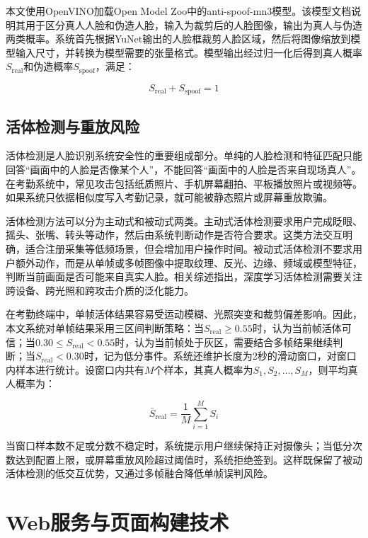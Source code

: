 本文使用OpenVINO加载Open Model Zoo中的anti-spoof-mn3模型。该模型文档说明其用于区分真人人脸和伪造人脸，输入为裁剪后的人脸图像，输出为真人与伪造两类概率\cite{openvino_anti_spoof}。系统首先根据YuNet输出的人脸框裁剪人脸区域，然后将图像缩放到模型输入尺寸，并转换为模型需要的张量格式。模型输出经过归一化后得到真人概率$S_{\text{real}}$和伪造概率$S_{\text{spoof}}$，满足：

\begin{equation}
    S_{\text{real}} + S_{\text{spoof}} = 1
\end{equation}

\subsection{活体检测与重放风险}

活体检测是人脸识别系统安全性的重要组成部分。单纯的人脸检测和特征匹配只能回答“画面中的人脸是否像某个人”，不能回答“画面中的人脸是否来自现场真人”。在考勤系统中，常见攻击包括纸质照片、手机屏幕翻拍、平板播放照片或视频等。如果系统只依据相似度写入考勤记录，就可能被静态照片或屏幕重放欺骗。

活体检测方法可以分为主动式和被动式两类。主动式活体检测要求用户完成眨眼、摇头、张嘴、转头等动作，然后由系统判断动作是否符合要求。这类方法交互明确，适合注册采集等低频场景，但会增加用户操作时间。被动式活体检测不要求用户额外动作，而是从单帧或多帧图像中提取纹理、反光、边缘、频域或模型特征，判断当前画面是否可能来自真实人脸。相关综述指出，深度学习活体检测需要关注跨设备、跨光照和跨攻击介质的泛化能力\cite{yu2023fas}。

在考勤终端中，单帧活体结果容易受运动模糊、光照突变和裁剪偏差影响。因此，本文系统对单帧结果采用三区间判断策略：当$S_{\text{real}} \geq 0.55$时，认为当前帧活体可信；当$0.30 \leq S_{\text{real}} < 0.55$时，认为当前帧处于灰区，需要结合多帧结果继续判断；当$S_{\text{real}} < 0.30$时，记为低分事件。系统还维护长度为2秒的滑动窗口，对窗口内样本进行统计。设窗口内共有$M$个样本，其真人概率为$S_1,S_2,\dots,S_M$，则平均真人概率为：

\begin{equation}
    \bar{S}_{\text{real}} = \frac{1}{M}\sum_{i=1}^{M}S_i
\end{equation}

当窗口样本数不足或分数不稳定时，系统提示用户继续保持正对摄像头；当低分次数达到配置上限，或屏幕重放风险超过阈值时，系统拒绝签到。这样既保留了被动活体检测的低交互优势，又通过多帧融合降低单帧误判风险。

\section{Web服务与页面构建技术}

